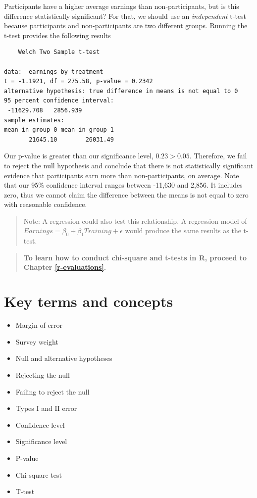 \documentclass[
]{book}
\providecommand{\tightlist}{%
  \setlength{\itemsep}{0pt}\setlength{\parskip}{0pt}}
\begin{document}
Participants have a higher average earnings than non-participants, but is this difference statistically significant? For that, we should use an \emph{independent} t-test because participants and non-participants are two different groups. Running the t-test provides the following results

\begin{verbatim}
	Welch Two Sample t-test

data:  earnings by treatment
t = -1.1921, df = 275.58, p-value = 0.2342
alternative hypothesis: true difference in means is not equal to 0
95 percent confidence interval:
 -11629.708   2856.939
sample estimates:
mean in group 0 mean in group 1 
       21645.10        26031.49 
\end{verbatim}

Our p-value is greater than our significance level, \(0.23>0.05\). Therefore, we fail to reject the null hypothesis and conclude that there is not statistically significant evidence that participants earn more than non-participants, on average. Note that our 95\% confidence interval ranges between -11,630 and 2,856. It includes zero, thus we cannot claim the difference between the means is not equal to zero with reasonable confidence.

\begin{quote}
Note: A regression could also test this relationship. A regression model of \(Earnings=\beta_0+\beta_1Training+\epsilon\) would produce the same results as the t-test.
\end{quote}

\begin{quote}
\textbf{To learn how to conduct chi-square and t-tests in R, proceed to Chapter \ref{r-evaluations}.}
\end{quote}

\hypertarget{kt11}{%
\section{Key terms and concepts}\label{kt11}}

\begin{itemize}
\tightlist
\item
  Margin of error
\item
  Survey weight
\item
  Null and alternative hypotheses
\item
  Rejecting the null
\item
  Failing to reject the null
\item
  Types I and II error
\item
  Confidence level
\item
  Significance level
\item
  P-value
\item
  Chi-square test
\item
  T-test
\end{itemize}
\end{document}
